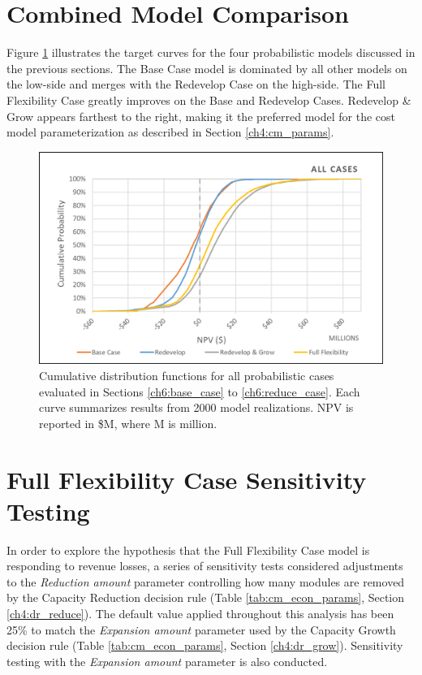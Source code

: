 \section{Combined Model Comparison}

Figure \ref{fig:all_case_cdf} illustrates the target curves for the four probabilistic models discussed in the previous sections. The Base Case model is dominated by all other models on the low-side and merges with the Redevelop Case on the high-side. The Full Flexibility Case greatly improves on the Base and Redevelop Cases. Redevelop \& Grow appears farthest to the right, making it the preferred model for the cost model parameterization as described in Section \ref{ch4:cm_params}. 

\begin{figure}[!htp]
\centering
\includegraphics[width=.85\textwidth]{templates/images/Figure-All_Case_CDF.png}
\caption[All Cases CDF]{Cumulative distribution functions for all probabilistic cases evaluated in Sections \ref{ch6:base_case} to \ref{ch6:reduce_case}. Each curve summarizes results from 2000 model realizations. NPV is reported in \$M, where M is million.}
\label{fig:all_case_cdf}
\end{figure}

\section{Full Flexibility Case Sensitivity Testing}\label{ch6:sensitivity}

In order to explore the hypothesis that the Full Flexibility Case model is responding to revenue losses, a series of sensitivity tests considered adjustments to the \textit{Reduction amount} parameter controlling how many modules are removed by the Capacity Reduction decision rule (Table \ref{tab:cm_econ_params}, Section \ref{ch4:dr_reduce}). The default value applied throughout this analysis has been 25\% to match the \textit{Expansion amount} parameter used by the Capacity Growth decision rule (Table \ref{tab:cm_econ_params}, Section \ref{ch4:dr_grow}). Sensitivity testing with the \textit{Expansion amount} parameter is also conducted.

